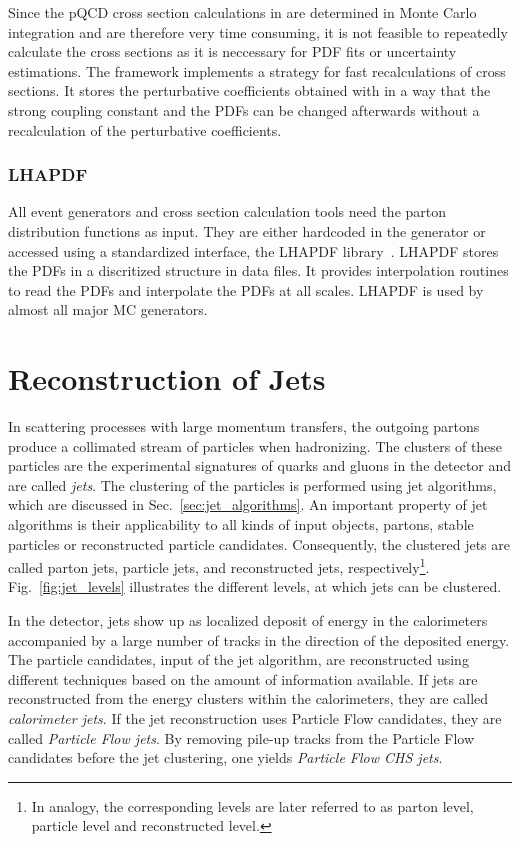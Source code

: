 Since the pQCD cross section calculations in \NLOJETPP are determined in Monte
Carlo integration and are therefore very time consuming, it is not feasible to
repeatedly calculate the cross sections as it is neccessary for PDF fits or
uncertainty estimations. The \fastNLO framework implements a strategy for fast
recalculations of cross sections. It stores the perturbative coefficients
obtained with \NLOJETPP in a way that the strong coupling constant and the PDFs
can be changed afterwards without a recalculation of the perturbative
coefficients.

\subsubsection{LHAPDF}

All event generators and cross section calculation tools need the parton
distribution functions as input. They are either hardcoded in the generator or
accessed using a standardized interface, the LHAPDF
library~\cite{Whalley:2005nh,Buckley:2014ana}. LHAPDF stores the PDFs in a discritized
structure in data files. It provides interpolation routines to read the PDFs and
interpolate the PDFs at all scales. LHAPDF is used by almost all major MC
generators.


\section{Reconstruction of Jets}
\label{sec:jet_reconstruction}

In scattering processes with large momentum transfers, the outgoing partons
produce a collimated stream of particles when hadronizing. The clusters of these
particles are the experimental signatures of quarks and gluons in the detector
and are called \emph{jets}. The clustering of the particles is performed using
jet algorithms, which are discussed in Sec.~\ref{sec:jet_algorithms}. An
important property of jet algorithms is their applicability to all kinds of
input objects, \ie partons, stable particles or reconstructed particle
candidates. Consequently, the clustered jets are called parton jets, particle
jets, and reconstructed jets, respectively\footnote{In analogy, the 
corresponding levels are later referred to as parton level, particle level
and reconstructed level.}. Fig.~\ref{fig:jet_levels} illustrates the different
levels, at which jets can be clustered.

In the \CMS detector, jets show up as localized deposit of energy in the
calorimeters accompanied by a large number of tracks in the direction of the
deposited energy. The particle candidates, input of the jet algorithm,  are
reconstructed using different techniques based on the amount of information
available. If jets are reconstructed from the energy clusters within the
calorimeters, they are called \emph{calorimeter jets}. If the jet reconstruction
uses Particle Flow candidates, they are called \emph{Particle Flow jets}. By
removing pile-up tracks from the Particle Flow candidates before the jet
clustering, one yields \emph{Particle Flow CHS jets}. 

